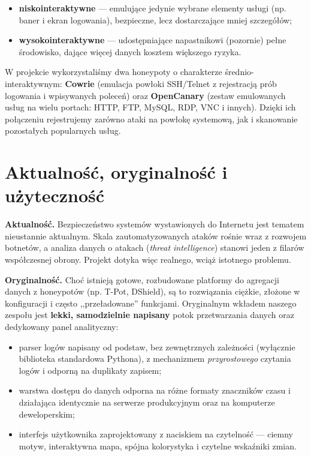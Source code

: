 \documentclass[12pt,a4paper]{report}
\begin{document}
\begin{itemize}
  \item \textbf{niskointeraktywne} --- emulujące jedynie wybrane elementy usługi
        (np. baner i ekran logowania), bezpieczne, lecz dostarczające mniej
        szczegółów;
  \item \textbf{wysokointeraktywne} --- udostępniające napastnikowi (pozornie)
        pełne środowisko, dające więcej danych kosztem większego ryzyka.
\end{itemize}

W projekcie wykorzystaliśmy dwa honeypoty o charakterze średnio-interaktywnym:
\textbf{Cowrie} (emulacja powłoki SSH/Telnet z rejestracją prób logowania
i wpisywanych poleceń) oraz \textbf{OpenCanary} (zestaw emulowanych usług na
wielu portach: HTTP, FTP, MySQL, RDP, VNC i innych). Dzięki ich połączeniu
rejestrujemy zarówno ataki na powłokę systemową, jak i skanowanie pozostałych
popularnych usług.

\section{Aktualność, oryginalność i użyteczność}

\textbf{Aktualność.} Bezpieczeństwo systemów wystawionych do Internetu jest
tematem nieustannie aktualnym. Skala zautomatyzowanych ataków rośnie wraz
z rozwojem botnetów, a analiza danych o atakach (\emph{threat intelligence})
stanowi jeden z filarów współczesnej obrony. Projekt dotyka więc realnego,
wciąż istotnego problemu.

\textbf{Oryginalność.} Choć istnieją gotowe, rozbudowane platformy do agregacji
danych z honeypotów (np. T-Pot, DShield), są to rozwiązania ciężkie, złożone
w konfiguracji i często ,,przeładowane'' funkcjami. Oryginalnym wkładem naszego
zespołu jest \textbf{lekki, samodzielnie napisany} potok przetwarzania danych
oraz dedykowany panel analityczny:

\begin{itemize}
  \item parser logów napisany od podstaw, bez zewnętrznych zależności
        (wyłącznie biblioteka standardowa Pythona), z mechanizmem
        \emph{przyrostowego} czytania logów i odporną na duplikaty zapisem;
  \item warstwa dostępu do danych odporna na różne formaty znaczników czasu
        i działająca identycznie na serwerze produkcyjnym oraz na komputerze
        deweloperskim;
  \item interfejs użytkownika zaprojektowany z naciskiem na czytelność ---
        ciemny motyw, interaktywna mapa, spójna kolorystyka i czytelne
        wskaźniki zmian.
\end{itemize}
\end{document}
